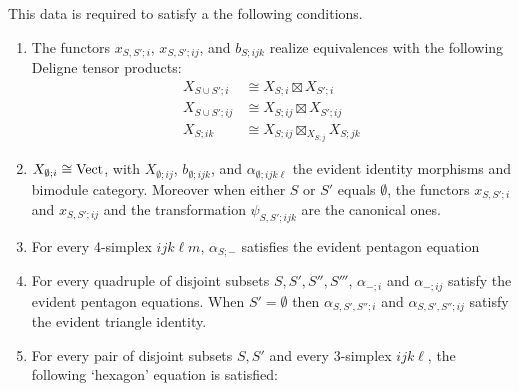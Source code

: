 \documentclass{amsart}
\begin{document}
This data is required to satisfy a the following conditions. 
\begin{enumerate}
	\item The functors $x_{S,S';i}$, $x_{S,S'; ij}$, and $b_{S;ijk}$ realize equivalences with the following Deligne tensor products:
	\begin{align*}
		X_{S \cup S'; i} &\cong X_{S; i} \boxtimes X_{S';i} \\ 
		X_{S \cup S'; ij} &\cong X_{S; ij} \boxtimes X_{S';ij} \\ 
		X_{S; ik} & \cong X_{S;ij} \boxtimes_{X_{S;j}} X_{S;jk}
	\end{align*}
	\item $X_{\emptyset; i} \cong \mathrm{Vect}$, with $X_{\emptyset; ij}$, $b_{\emptyset; ijk}$, and $\alpha_{\emptyset; ijk\ell}$ the evident identity morphisms and bimodule category. Moreover when either $S$ or $S'$ equals $\emptyset$, the functors $x_{S,S'; i}$ and $x_{S, S'; ij}$ and the transformation $\psi_{S,S'; ijk}$ are the canonical ones.  
	\item For every 4-simplex $ijk\ell m$, $\alpha_{S; -}$ satisfies the evident pentagon equation
	\item For every quadruple of disjoint subsets $S, S', S'', S'''$, $\alpha_{-; i}$ and $\alpha_{-; ij}$ satisfy the evident pentagon equations. When $S' = \emptyset$ then $\alpha_{S, S', S''; i}$ and $\alpha_{S, S', S''; ij}$ satisfy the evident triangle identity. 
	\item For every pair of disjoint subsets $S, S'$ and every 3-simplex $ijk\ell$, the following `hexagon' equation is satisfied:
\begin{center}
\end{center}
\end{enumerate}
\end{document}
